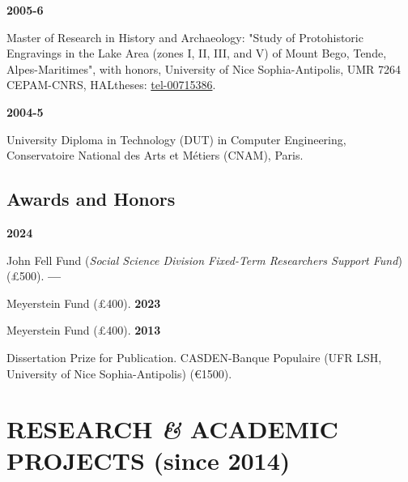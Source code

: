 \documentclass{article}
\newcommand{\fr}[1]{}       %
\newcommand{\en}[1]{#1}     %
\begin{document}
\smallbreak
\textbf{2005-6} 
\fr{Master 2 Recherche en Histoire et Archéologie: "Étude des gravures protohistoriques de la zone des lacs (zones I, II, III et V) de la région du mont Bego, Tende, Alpes-Maritimes", mention bien, Université Nice Sophia-Antipolis, UMR 7264 CEPAM-CNRS, HALtheses: \href{https://tel.archives-ouvertes.fr/tel-00715386}{tel-00715386}.}
\en{Master of Research in History and Archaeology: "Study of Protohistoric Engravings in the Lake Area (zones I, II, III, and V) of Mount Bego, Tende, Alpes-Maritimes", with honors, University of Nice Sophia-Antipolis, UMR 7264 CEPAM-CNRS, HALtheses: \href{https://tel.archives-ouvertes.fr/tel-00715386}{tel-00715386}.}

\smallbreak
\textbf{2004-5} 
\fr{Diplôme universitaire de technologie (DUT) Génie informatique, Conservatoire National des Arts et Métiers (CNAM), Paris.}
\en{University Diploma in Technology (DUT) in Computer Engineering, Conservatoire National des Arts et Métiers (CNAM), Paris.}

\subsection*{\fr{Prix et récompenses}\en{Awards and Honors}}

\textbf{2024} 
\fr{Fonds John Fell (\textit{Social Science Division Fixed-Term Researchers Support Fund}) (£500).}
\en{John Fell Fund (\textit{Social Science Division Fixed-Term Researchers Support Fund}) (£500).}
\smallbreak
\textbf{--- } 
\fr{Fonds Meyerstein (£400).}
\en{Meyerstein Fund (£400).}
\smallbreak
\textbf{2023} 
\fr{Fonds Meyerstein (£400).}
\en{Meyerstein Fund (£400).}
\smallbreak
\textbf{2013} 
\fr{Prix de thèse pour publication. CASDEN-Banque Populaire (UFR LSH, Université Nice Sophia-Antipolis) (1500€).}
\en{Dissertation Prize for Publication. CASDEN-Banque Populaire (UFR LSH, University of Nice Sophia-Antipolis) (€1500).}

\section{\fr{PROJETS DE RECHERCHE \textit{\&} ACADÉMIQUES (depuis 2014)}\en{RESEARCH \textit{\&} ACADEMIC PROJECTS (since 2014)}}
\end{document}
